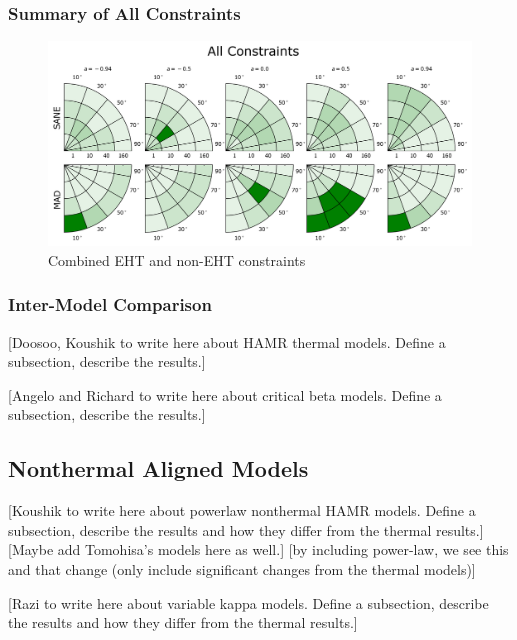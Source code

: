 \subsubsection{Summary of All Constraints}

\begin{figure}
  \centering
  \includegraphics[width=\columnwidth]{./figures/All_Constraints.png}
  \caption{Combined EHT and non-EHT constraints}
  \label{fig:all_cuts}
\end{figure}

\subsubsection{Inter-Model Comparison}


[Doosoo, Koushik to write here about HAMR thermal models.  Define a subsection, describe the results.]

[Angelo and Richard to write here about critical beta models.  Define a subsection, describe the results.]




\subsection{Nonthermal Aligned Models}

[Koushik to write here about powerlaw nonthermal HAMR models.  Define a subsection, describe the results and how they differ from the thermal results.][Maybe add Tomohisa's models here as well.] [by including power-law, we see this and that change (only include significant changes from the thermal models)]

[Razi to write here about variable kappa models.  Define a subsection, describe the results and how they differ from the thermal results.]


